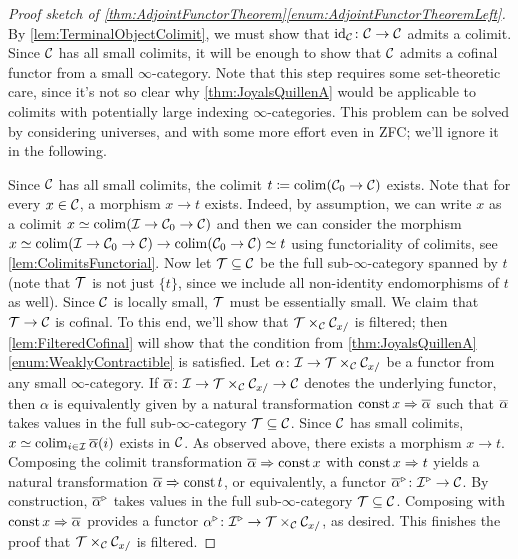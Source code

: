 \begin{proof}[Proof sketch of \cref{thm:AdjointFunctorTheorem}\cref{enum:AdjointFunctorTheoremLeft}]
	By \cref{lem:TerminalObjectColimit}, we must show that $\operatorname{id}_{\mathcal{C}}\colon \mathcal{C}\rightarrow\mathcal{C}$ admits a colimit. Since $\mathcal{C}$ has all small colimits, it will be enough to show that $\mathcal{C}$ admits a cofinal functor from a small $\infty$-category. Note that this step requires some set-theoretic care, since it's not so clear why \cref{thm:JoyalsQuillenA} would be applicable to colimits with potentially large indexing $\infty$-categories. This problem can be solved by considering universes, and with some more effort even in ZFC; we'll ignore it in the following.
	
	Since $\mathcal{C}$ has all small colimits, the colimit $t\coloneqq\operatorname*{colim}(\mathcal{C}_0\rightarrow\mathcal{C})$ exists. Note that for every $x\in\mathcal{C}$, a morphism $x\rightarrow t$ exists. Indeed, by assumption, we can write $x$ as a colimit $x\simeq \operatorname*{colim}(\mathcal{I}\rightarrow\mathcal{C}_0\rightarrow\mathcal{C})$ and then we can consider the morphism $x\simeq \operatorname*{colim}(\mathcal{I}\rightarrow\mathcal{C}_0\rightarrow\mathcal{C})\rightarrow\operatorname*{colim}(\mathcal{C}_0\rightarrow\mathcal{C})\simeq t$ using functoriality of colimits, see \cref{lem:ColimitsFunctorial}. Now let $\mathcal{T}\subseteq \mathcal{C}$ be the full sub-$\infty$-category spanned by $t$ (note that $\mathcal{T}$ is not just $\{t\}$, since we include all non-identity endomorphisms of $t$ as well). Since $\mathcal{C}$ is locally small, $\mathcal{T}$ must be essentially small. We claim that $\mathcal{T}\rightarrow\mathcal{C}$ is cofinal. To this end, we'll show that $\mathcal{T}\times_{\mathcal{C}}\mathcal{C}_{x/}$ is filtered; then \cref{lem:FilteredCofinal} will show that the condition from \cref{thm:JoyalsQuillenA}\cref{enum:WeaklyContractible} is satisfied. Let $\alpha\colon \mathcal{I}\rightarrow\mathcal{T}\times_{\mathcal{C}}\mathcal{C}_{x/}$ be a functor from any small $\infty$-category. If $\ov\alpha\colon \Ii\rightarrow\Tt\times_\Cc\Cc_{x/}\rightarrow\Cc$ denotes the underlying functor, then $\alpha$ is equivalently given by a natural transformation $\const x\Rightarrow \ov\alpha$ such that $\ov\alpha$ takes values in the full sub-$\infty$-category $\mathcal{T}\subseteq\mathcal{C}$. Since $\mathcal{C}$ has small colimits, $x\simeq\colimit_{i\in\Ii}\ov\alpha(i)$ exists in $\mathcal{C}$. As observed above, there exists a morphism $x\rightarrow t$. Composing the colimit transformation $\ov\alpha\Rightarrow \const x$ with $\operatorname{const} x\Rightarrow t$ yields a natural transformation $\ov\alpha\Rightarrow \const t$, or equivalently, a functor $\ov\alpha^\triangleright\colon \Ii^\triangleright \rightarrow \Cc$. By construction, $\ov\alpha^\triangleright$ takes values in the full sub-$\infty$-category $\mathcal{T}\subseteq\mathcal{C}$. Composing with $\const x\Rightarrow \ov\alpha$ provides a functor $\alpha^\triangleright\colon \mathcal{I}^\triangleright\rightarrow\mathcal{T}\times_{\mathcal{C}}\mathcal{C}_{x/}$, as desired. This finishes the proof that $\mathcal{T}\times_{\mathcal{C}}\mathcal{C}_{x/}$ is filtered.%
\end{proof}
